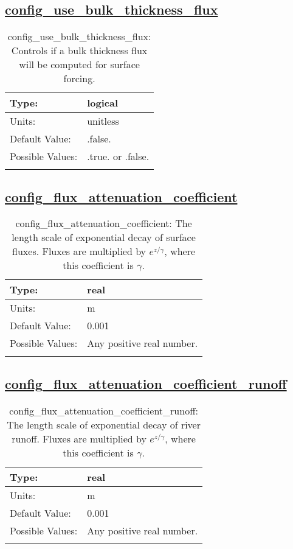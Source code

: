 \subsection[config\_use\_bulk\_thickness\_flux]{\hyperref[sec:nm_tab_forcing]{config\_use\_bulk\_thickness\_flux}}
\label{subsec:nm_sec_config_use_bulk_thickness_flux}
\begin{center}
\begin{longtable}{| p{2.0in} || p{4.0in} |}
    \hline
    Type: & logical \\
    \hline
    Units: & \si{unitless} \\
    \hline
    Default Value: & .false. \\
    \hline
    Possible Values: & .true. or .false. \\
    \hline
    \caption{config\_use\_bulk\_thickness\_flux: Controls if a bulk thickness flux will be computed for surface forcing.}
\end{longtable}
\end{center}
\subsection[config\_flux\_attenuation\_coefficient]{\hyperref[sec:nm_tab_forcing]{config\_flux\_attenuation\_coefficient}}
\label{subsec:nm_sec_config_flux_attenuation_coefficient}
\begin{center}
\begin{longtable}{| p{2.0in} || p{4.0in} |}
    \hline
    Type: & real \\
    \hline
    Units: & \si{m} \\
    \hline
    Default Value: & 0.001 \\
    \hline
    Possible Values: & Any positive real number. \\
    \hline
    \caption{config\_flux\_attenuation\_coefficient: The length scale of exponential decay of surface fluxes. Fluxes are multiplied by $e^{z/\gamma}$, where this coefficient is $\gamma$.}
\end{longtable}
\end{center}
\subsection[config\_flux\_attenuation\_coefficient\_runoff]{\hyperref[sec:nm_tab_forcing]{config\_flux\_attenuation\_coefficient\_runoff}}
\label{subsec:nm_sec_config_flux_attenuation_coefficient_runoff}
\begin{center}
\begin{longtable}{| p{2.0in} || p{4.0in} |}
    \hline
    Type: & real \\
    \hline
    Units: & \si{m} \\
    \hline
    Default Value: & 0.001 \\
    \hline
    Possible Values: & Any positive real number. \\
    \hline
    \caption{config\_flux\_attenuation\_coefficient\_runoff: The length scale of exponential decay of river runoff. Fluxes are multiplied by $e^{z/\gamma}$, where this coefficient is $\gamma$.}
\end{longtable}
\end{center}
